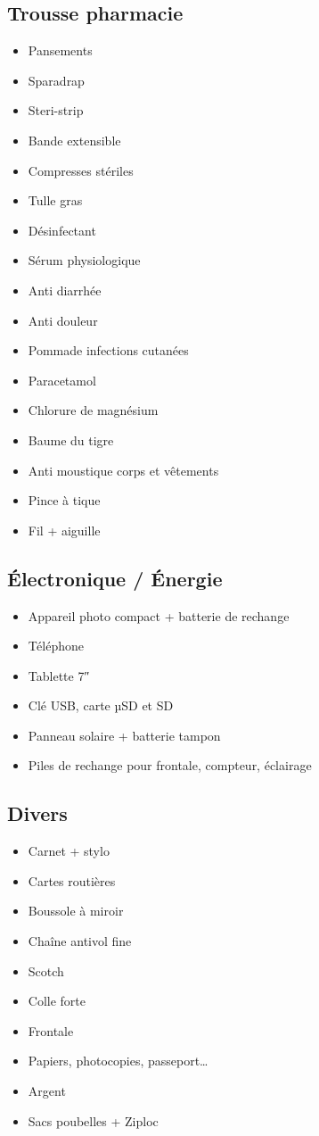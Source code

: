   \subsection*{Trousse pharmacie}
 \begin{itemize}
 \item Pansements
 \item Sparadrap
 \item Steri-strip
 \item Bande extensible
 \item Compresses stériles
 \item Tulle gras
 \item Désinfectant
 \item Sérum physiologique
 \item Anti diarrhée
 \item Anti douleur
 \item Pommade infections cutanées
 \item Paracetamol
 \item Chlorure de magnésium
 \item Baume du tigre
 \item Anti moustique corps et vêtements
 \item Pince à tique
 \item Fil + aiguille
 \end{itemize}
 
  \subsection*{Électronique / Énergie}
 \begin{itemize}
 \item Appareil photo compact + batterie de rechange
 \item Téléphone
 \item Tablette 7″
 \item Clé USB, carte µSD et SD
 \item Panneau solaire + batterie tampon
 \item Piles de rechange pour frontale, compteur, éclairage
 \end{itemize}
 
  \subsection*{Divers}
 \begin{itemize}
 \item Carnet + stylo
 \item Cartes routières
 \item Boussole à miroir
 \item Chaîne antivol fine
 \item Scotch
 \item Colle forte
 \item Frontale
 \item Papiers, photocopies, passeport…
 \item Argent
 \item Sacs poubelles + Ziploc
 \end{itemize}
